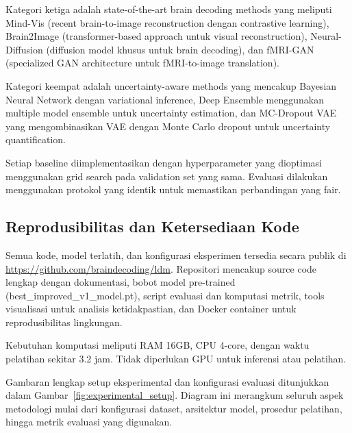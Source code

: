Kategori ketiga adalah state-of-the-art brain decoding methods yang meliputi Mind-Vis (recent brain-to-image reconstruction dengan contrastive learning), Brain2Image (transformer-based approach untuk visual reconstruction), Neural-Diffusion (diffusion model khusus untuk brain decoding), dan fMRI-GAN (specialized GAN architecture untuk fMRI-to-image translation).

Kategori keempat adalah uncertainty-aware methods yang mencakup Bayesian Neural Network dengan variational inference, Deep Ensemble menggunakan multiple model ensemble untuk uncertainty estimation, dan MC-Dropout VAE yang mengombinasikan VAE dengan Monte Carlo dropout untuk uncertainty quantification.

Setiap baseline diimplementasikan dengan hyperparameter yang dioptimasi menggunakan grid search pada validation set yang sama. Evaluasi dilakukan menggunakan protokol yang identik untuk memastikan perbandingan yang fair.

\subsection{Reprodusibilitas dan Ketersediaan Kode}

Semua kode, model terlatih, dan konfigurasi eksperimen tersedia secara publik di \url{https://github.com/braindecoding/ldm}. Repositori mencakup source code lengkap dengan dokumentasi, bobot model pre-trained (best\_improved\_v1\_model.pt), script evaluasi dan komputasi metrik, tools visualisasi untuk analisis ketidakpastian, dan Docker container untuk reprodusibilitas lingkungan.

Kebutuhan komputasi meliputi RAM 16GB, CPU 4-core, dengan waktu pelatihan sekitar 3.2 jam. Tidak diperlukan GPU untuk inferensi atau pelatihan.

Gambaran lengkap setup eksperimental dan konfigurasi evaluasi ditunjukkan dalam Gambar~\ref{fig:experimental_setup}. Diagram ini merangkum seluruh aspek metodologi mulai dari konfigurasi dataset, arsitektur model, prosedur pelatihan, hingga metrik evaluasi yang digunakan.

